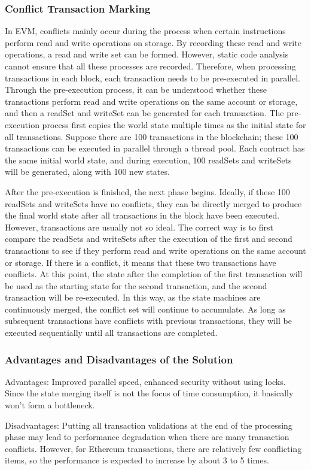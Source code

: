 \subsubsection{Conflict Transaction Marking}

In EVM, conflicts mainly occur during the process when certain instructions perform read and write operations on storage. By recording these read and write operations, a read and write set can be formed. However, static code analysis cannot ensure that all these processes are recorded. Therefore, when processing transactions in each block, each transaction needs to be pre-executed in parallel. Through the pre-execution process, it can be understood whether these transactions perform read and write operations on the same account or storage, and then a readSet and writeSet can be generated for each transaction. The pre-execution process first copies the world state multiple times as the initial state for all transactions. Suppose there are 100 transactions in the blockchain; these 100 transactions can be executed in parallel through a thread pool. Each contract has the same initial world state, and during execution, 100 readSets and writeSets will be generated, along with 100 new states.

After the pre-execution is finished, the next phase begins. Ideally, if these 100 readSets and writeSets have no conflicts, they can be directly merged to produce the final world state after all transactions in the block have been executed. However, transactions are usually not so ideal. The correct way is to first compare the readSets and writeSets after the execution of the first and second transactions to see if they perform read and write operations on the same account or storage. If there is a conflict, it means that these two transactions have conflicts. At this point, the state after the completion of the first transaction will be used as the starting state for the second transaction, and the second transaction will be re-executed. In this way, as the state machines are continuously merged, the conflict set will continue to accumulate. As long as subsequent transactions have conflicts with previous transactions, they will be executed sequentially until all transactions are completed.

\subsubsection{Advantages and Disadvantages of the Solution}

Advantages: Improved parallel speed, enhanced security without using locks. Since the state merging itself is not the focus of time consumption, it basically won't form a bottleneck.

Disadvantages: Putting all transaction validations at the end of the processing phase may lead to performance degradation when there are many transaction conflicts. However, for Ethereum transactions, there are relatively few conflicting items, so the performance is expected to increase by about 3 to 5 times.
